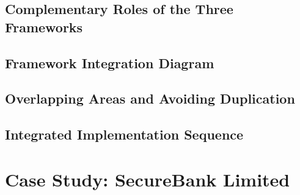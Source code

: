 \subsection{Complementary Roles of the Three Frameworks}



\subsection{Framework Integration Diagram}



\subsection{Overlapping Areas and Avoiding Duplication}




\subsection{Integrated Implementation Sequence}




\section{Case Study: SecureBank Limited}




